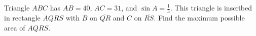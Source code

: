 Triangle $ABC$ has $AB = 40$, $AC = 31$, and $\sin A = \tfrac15$. This triangle is inscribed in rectangle $AQRS$ with $B$ on $\overline{QR}$ and $C$ on $\overline{RS}$. Find the maximum possible area of $AQRS$.